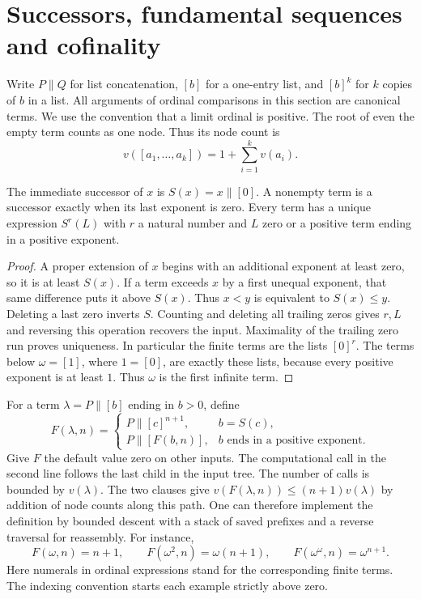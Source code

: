 \section{Successors, fundamental sequences and cofinality}
\label{sec:fundseq}

Write $P\mathbin{\|}Q$ for list concatenation, $[b]$ for a one-entry
list, and $[b]^k$ for $k$ copies of $b$ in a list.
All arguments of ordinal comparisons in this section are canonical terms.
We use the convention that a limit ordinal is positive.
The root of even the empty term counts as one node. Thus its node count is
\[
 v([a_1,\ldots,a_k])=1+\sum_{i=1}^k v(a_i).
\]

\begin{proposition}
The immediate successor of $x$ is $S(x)=x\mathbin{\|}[0]$.
A nonempty term is a successor exactly when its last exponent is zero.
Every term has a unique expression $S^r(L)$ with $r$ a natural number and
$L$ zero or a positive term ending in a positive exponent.
\end{proposition}
\begin{proof}
A proper extension of $x$ begins with an additional exponent at least zero,
so it is at least $S(x)$. If a term exceeds $x$ by a first unequal
exponent, that same difference puts it above $S(x)$.
Thus $x<y$ is equivalent to $S(x)\le y$.
Deleting a last zero inverts $S$. Counting and deleting all trailing
zeros gives $r,L$ and reversing this operation recovers the input.
Maximality of the trailing zero run proves uniqueness. In particular the
finite terms are the lists $[0]^r$. The terms below $\omega=[1]$, where
$1=[0]$, are exactly these lists, because every positive exponent is at least
$1$. Thus $\omega$ is the first infinite term.
\end{proof}

For a term $\lambda=P\mathbin{\|}[b]$ ending in $b>0$, define
\[
 F(\lambda,n)=
 \begin{cases}
 P\mathbin{\|}[c]^{n+1},& b=S(c),\\
 P\mathbin{\|}[F(b,n)],& b\text{ ends in a positive exponent}.
 \end{cases}
\]
Give $F$ the default value zero on other inputs. The computational call
in the second line follows the last child in the input tree.
The number of calls is bounded by $v(\lambda)$. The two clauses give
$v(F(\lambda,n))\le(n+1)v(\lambda)$ by addition of node counts along
this path. One can therefore implement the definition by bounded
descent with a stack of saved prefixes and a reverse traversal for
reassembly. For instance,
\[
 F(\omega,n)=n+1,\qquad
 F(\omega^2,n)=\omega(n+1),\qquad
 F(\omega^\omega,n)=\omega^{n+1}.
\]
Here numerals in ordinal expressions stand for the corresponding finite
terms. The indexing convention starts each example strictly above zero.

